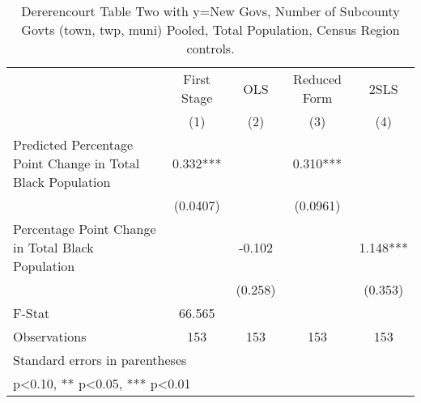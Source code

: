 \begin{table}[htbp]\centering
\def\sym#1{\ifmmode^{#1}\else\(^{#1}\)\fi}
\caption{Dererencourt Table Two with y=New Govs, Number of Subcounty Govts (town, twp, muni)  Pooled, Total Population, Census Region controls.}
\begin{tabular}{l*{4}{c}}
\toprule
                    & First Stage   &         OLS   &Reduced Form   &        2SLS   \\
                    &\multicolumn{1}{c}{(1)}   &\multicolumn{1}{c}{(2)}   &\multicolumn{1}{c}{(3)}   &\multicolumn{1}{c}{(4)}   \\
\midrule
Predicted Percentage Point Change in Total Black Population&       0.332***&               &       0.310***&               \\
                    &    (0.0407)   &               &    (0.0961)   &               \\
\addlinespace
Percentage Point Change in Total Black Population&               &      -0.102   &               &       1.148***\\
                    &               &     (0.258)   &               &     (0.353)   \\
\midrule
F-Stat              &      66.565   &               &               &               \\
Observations        &         153   &         153   &         153   &         153   \\
\bottomrule
\multicolumn{5}{l}{\footnotesize Standard errors in parentheses}\\
\multicolumn{5}{l}{\footnotesize * p<0.10, ** p<0.05, *** p<0.01}\\
\end{tabular}
\end{table}

